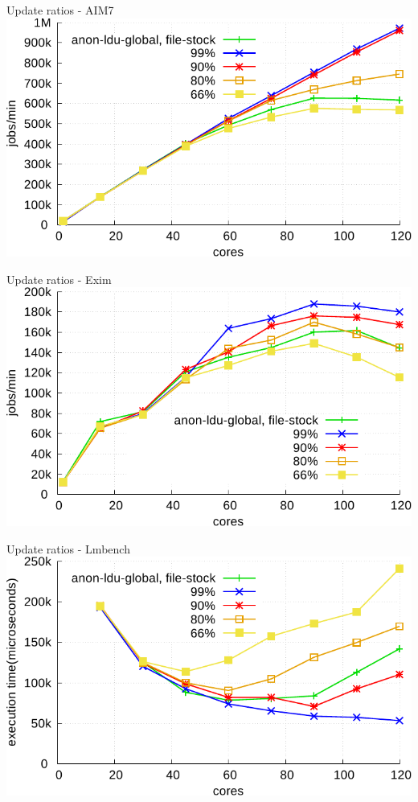 \documentclass[english]{beamer} %
\begin{document}
\begin{frame}{Update ratios - AIM7}
\includegraphics[scale=0.8]{graph/ratio_aim7_core}
\end{frame}

\begin{frame}{Update ratios - Exim}
\includegraphics[scale=0.8]{graph/ratio_exim_core}
\end{frame}

\begin{frame}{Update ratios - Lmbench}
\includegraphics[scale=0.8]{graph/ratio_lmbench_core}
\end{frame}
\end{document}
